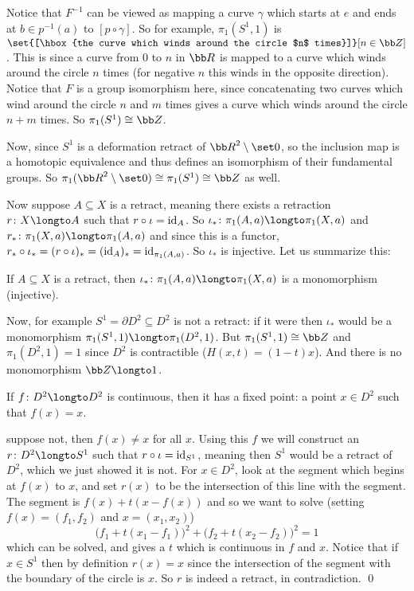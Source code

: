 Notice that $F^{-1}$ can be viewed as mapping a curve $\gamma$ which starts at $e$ and ends at $b\in p^{-1}(a)$ to $[p\circ\gamma]$.
So for example, $\pi_1(S^1,1)$ is $\set{[\hbox{the curve which winds around the circle $n$ times}]}[n\in{\bb Z}]$.
This is since a curve from $0$ to $n$ in ${\bb R}$ is mapped to a curve which winds around the circle $n$ times (for negative $n$ this winds in the opposite direction).
Notice that $F$ is a group isomorphism here, since concatenating two curves which wind around the circle $n$ and $m$ times gives a curve which winds around the circle $n+m$ times.
So $\pi_1(S^1)\cong{\bb Z}$.

Now, since $S^1$ is a deformation retract of ${\bb R}^2\setminus\set0$, so the inclusion map is a homotopic equivalence and thus defines an isomorphism of their fundamental groups.
So $\pi_1({\bb R}^2\setminus\set0)\cong\pi_1(S^1)\cong{\bb Z}$ as well.

Now suppose $A\subseteq X$ is a retract, meaning there exists a retraction $r\colon X\longto A$ such that $r\circ\iota={\rm id}_A$.
So $\iota_*\colon\pi_1(A,a)\longto\pi_1(X,a)$ and $r_*\colon\pi_1(X,a)\longto\pi_1(A,a)$ and since this is a functor, $r_*\circ\iota_*=(r\circ\iota)_*=({\rm id}_A)_*={\rm id}_{\pi_1(A,a)}$.
So $\iota_*$ is injective.
Let us summarize this:

\bprop

    If $A\subseteq X$ is a retract, then $\iota_*\colon\pi_1(A,a)\longto\pi_1(X,a)$ is a monomorphism (injective).

\eprop

Now, for example $S^1=\partial D^2\subseteq D^2$ is not a retract: if it were then $\iota_*$ would be a monomorphism $\pi_1(S^1,1)\longto\pi_1(D^2,1)$.
But $\pi_1(S^1,1)\cong{\bb Z}$ and $\pi_1(D^2,1)=1$ since $D^2$ is contractible ($H(x,t)=(1-t)x$).
And there is no monomorphism ${\bb Z}\longto1$.

\bthrm[title=Brouwer Fixed-Point Theorem (for $D^2$), name=fpthrm]

    If $f\colon D^2\longto D^2$ is continuous, then it has a fixed point: a point $x\in D^2$ such that $f(x)=x$.

\ethrm

\Proof suppose not, then $f(x)\neq x$ for all $x$.
Using this $f$ we will construct an $r\colon D^2\longto S^1$ such that $r\circ\iota={\rm id}_{S^1}$, meaning then $S^1$ would be a retract of $D^2$, which we just showed it is not.
For $x\in D^2$, look at the segment which begins at $f(x)$ to $x$, and set $r(x)$ to be the intersection of this line with the segment.
The segment is $f(x)+t(x-f(x))$ and so we want to solve (setting $f(x)=(f_1,f_2)$ and $x=(x_1,x_2)$)
$$ \bigl(f_1+t(x_1-f_1)\bigr)^2 + \bigl(f_2+t(x_2-f_2)\bigr)^2 = 1 $$
which can be solved, and gives a $t$ which is continuous in $f$ and $x$.
Notice that if $x\in S^1$ then by definition $r(x)=x$ since the intersection of the segment with the boundary of the circle is $x$.
So $r$ is indeed a retract, in contradiction.
\qed

\bye

